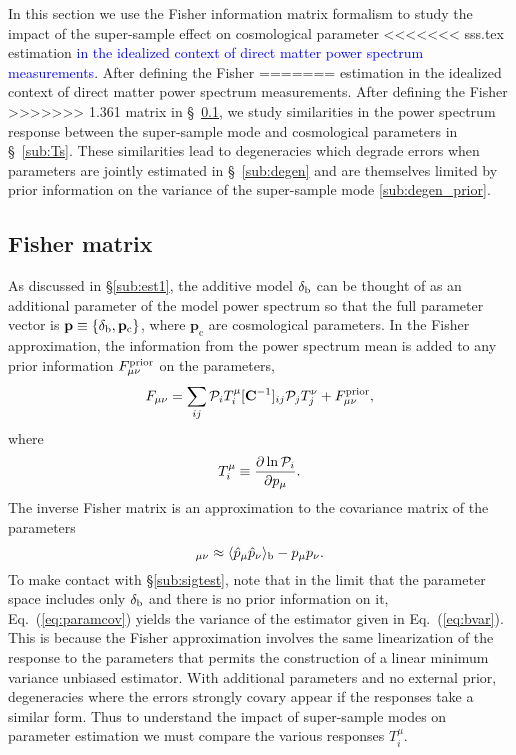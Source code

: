 \documentclass[prd,twocolumn,amsmath,amssymb,floatfix,superscriptaddress]{revtex4-1}
\newcommand{\wh}[1]{\textcolor{blue}{#1}}
\newcommand{\br}{{\rm b}}
\newcommand{\Dv}{{\cal P}}
\begin{document}
{{In this section we use the Fisher information matrix formalism to
study the impact of the super-sample effect on cosmological parameter
<<<<<<< sss.tex
estimation \wh{in the idealized context of direct matter power spectrum measurements}.  After defining the Fisher  
=======
estimation in the idealized context of direct matter power spectrum measurements.  After defining the Fisher  
>>>>>>> 1.361
matrix in \S~\ref{sub:est2}, we study similarities in the power spectrum response
between the super-sample mode and cosmological parameters
in
\S~\ref{sub:Ts}.   These similarities lead to degeneracies 
which degrade errors when parameters are jointly estimated
in \S~\ref{sub:degen} and are themselves limited by 
prior information on the variance of the super-sample mode
\ref{sub:degen_prior}.


\subsection{Fisher matrix}
\label{sub:est2}

As discussed in \S \ref{sub:est1}, the additive
model $\delta_\br$ can be thought of as an additional parameter of the model
power spectrum so that the full parameter vector is 
$ \mathbf{p}\equiv\{\delta_\br,  \mathbf{p}_\textrm{c}\}$, where $\mathbf{p}_\textrm{c}$ are cosmological parameters.   In the Fisher approximation, the information
from the power spectrum mean is added to any prior information  $F_{\mu\nu}^{\rm prior}$
on the parameters,
\begin{equation}
F_{\mu\nu} = \sum_{ij} \Dv_i T_i^{\mu} [{\bf C}^{-1}]_{ij} \Dv_j T_j^{\nu} + F_{\mu\nu}^{\rm prior},
\label{eq:covp}
\end{equation}
where 
\begin{equation}
    T_i^{\mu} \equiv \frac{\partial\ln\Dv_i}{\partial p_\mu}.
\end{equation}
The inverse Fisher matrix
is an approximation to the covariance matrix of the parameters
\begin{equation}
 [{\bf F}^{-1}]_{\mu\nu}\approx \langle \hat{ p}_\mu \hat{ p}_\nu \rangle_\br
    -  p_\mu  p_\nu .
    \label{eq:paramcov}
\end{equation}
To make contact with \S \ref{sub:sigtest}, note that in the limit that the parameter space
includes only $\delta_\br$ and there is no prior information on it, Eq.~(\ref{eq:paramcov}) yields the variance
of the estimator given in Eq.~(\ref{eq:bvar}).  This is because  the Fisher approximation involves
the same linearization of the response to the parameters that permits the construction of
a linear  minimum variance unbiased estimator.
With additional parameters and no external prior, degeneracies  where the errors strongly covary appear if
the responses take a similar form.   Thus to understand the impact of super-sample modes on
parameter estimation we must compare the various responses $T_i^\mu$.   



}}
\end{document}

